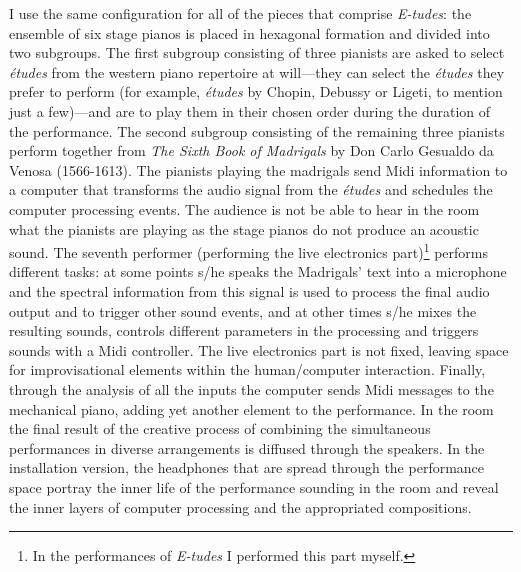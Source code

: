 I use the same configuration for all of the pieces that comprise \emph{E-tudes}: the ensemble of six stage pianos is placed in hexagonal formation and divided into two subgroups. The first subgroup consisting of three pianists are asked to select \emph{\'{e}tudes} from the western piano repertoire at will---they can select the \emph{\'{e}tudes} they prefer to perform (for example, \emph{\'{e}tudes} by Chopin, Debussy or Ligeti, to mention just a few)---and are to play them in their chosen order during the duration of the performance. The second subgroup consisting of the remaining three pianists perform together from \emph{The Sixth Book of Madrigals} by Don Carlo Gesualdo da Venosa (1566-1613). The pianists playing the madrigals send Midi information to a computer that transforms the audio signal from the \emph{\'{e}tudes} and schedules the computer processing events. The audience is not be able to hear in the room what the pianists are playing as the stage pianos do not produce an acoustic sound. The seventh performer (performing the live electronics part)\footnote{In the performances of \emph{E-tudes} I performed this part myself.} performs different tasks: at some points s/he speaks the Madrigals' text into a microphone and the spectral information from this signal is used to process the final audio output and to trigger other sound events, and at other times s/he mixes the resulting sounds, controls different parameters in the processing and  triggers sounds with a Midi controller. The live electronics part is not fixed, leaving space for improvisational elements within the human/computer interaction. Finally, through the analysis of all the inputs the computer sends Midi messages to the mechanical piano, adding yet another element to the performance. In the room the final result of the creative process of combining the simultaneous performances in diverse arrangements is diffused through the speakers. In the installation version, the headphones that are spread through the performance space portray the inner life of the performance sounding in the room and reveal the inner layers of computer processing and the appropriated compositions.

